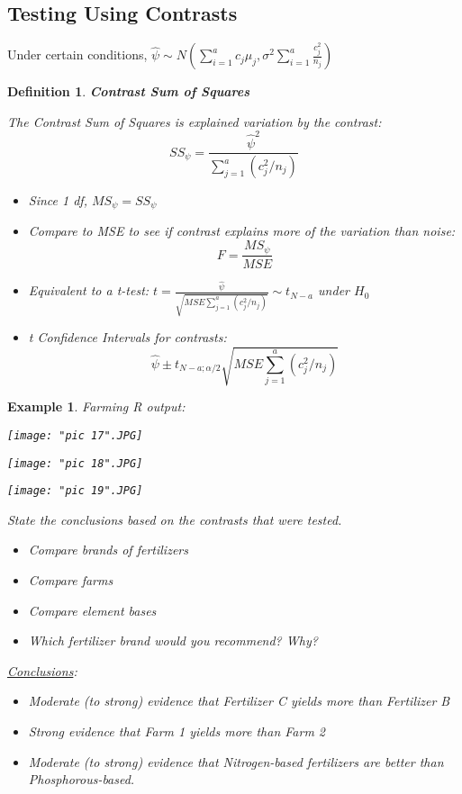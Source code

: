 \documentclass[a4paper,11pt]{article}
\newtheorem{defn}[thm]{Definition}
\newtheorem{eg}[thm]{Example}
\begin{document}
\subsection{Testing Using Contrasts}
Under certain conditions, $\hat{\psi}\sim N\left(\sum_{i=1}^ac_j\mu_j, \sigma^2\sum_{i=1}^a\frac{c_j^2}{n_j}\right)$
\begin{defn}
\normalfont
\textbf{Contrast Sum of Squares}

The Contrast Sum of Squares is explained variation by the contrast: 
$$SS_{\psi}=\frac{\hat{\psi}^2}{\sum_{j=1}^a(c_j^2/n_j)}$$
\begin{itemize}
\item Since 1 df, $MS_{\psi}=SS_{\psi}$
\item Compare to MSE to see if contrast explains more of the variation than noise:
$$F=\frac{MS_{\psi}}{MSE}$$
\item Equivalent to a t-test: $t=\frac{\hat{\psi}}{\sqrt{MSE\sum_{j=1}^a(c_j^2/n_j)}}\sim t_{N-a}$ under $H_0$
\item t Confidence Intervals for contrasts:
$$\hat{\psi}\pm t_{N-a;\alpha/2}\sqrt{MSE\sum_{j=1}^a(c_j^2/n_j)}$$
\end{itemize}
\end{defn}
\newpage
\begin{eg}
\normalfont
Farming R output: 

\begin{center}
	\texttt{[image: "pic 17".JPG]}
\end{center}

\begin{center}
	\texttt{[image: "pic 18".JPG]}
\end{center}

\begin{center}
	\texttt{[image: "pic 19".JPG]}
\end{center}

State the conclusions based on the contrasts that were tested. 
\begin{itemize}
\item Compare brands of fertilizers
\item Compare farms
\item Compare element bases
\item Which fertilizer brand would you recommend? Why?
\end{itemize}
\underline{Conclusions}: 
\begin{itemize}
\item Moderate (to strong) evidence that Fertilizer C yields more than Fertilizer B
\item Strong evidence that Farm 1 yields more than Farm 2
\item Moderate (to strong) evidence that Nitrogen-based fertilizers are better than Phosphorous-based.
\end{itemize}
\end{eg}
\end{document}
